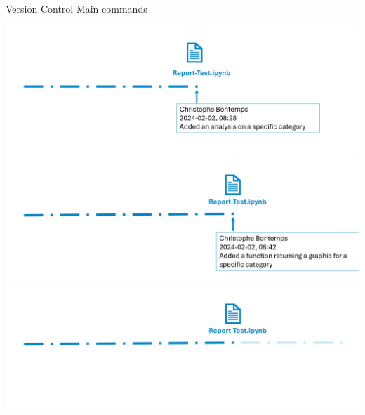 \documentclass[xcolor=x11names,compress]{beamer}
\renewcommand{\(}{\begin{columns}}
\renewcommand{\)}{\end{columns}}
\newcommand{\<}[1]{\begin{column}{#1}}
\renewcommand{\>}{\end{column}}
\begin{document}
\begin{frame}{Version Control Main commands}
\begin{center}
\begin{itemize}
    {\includegraphics[width = 1.0\textwidth]{FileLife5.png} \\ }
    {\includegraphics[width = 1.0\textwidth]{FileLife6.png} \\ }
    {\includegraphics[width = 1.0\textwidth]{FileLife7.png} \\ }
\end{itemize}
\end{center}
\end{frame}
\end{document}
